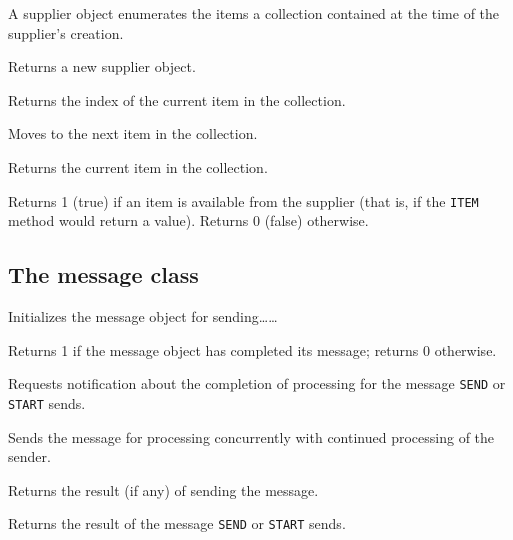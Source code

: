 A supplier object enumerates the items a collection contained at the
time of the supplier's creation.



Returns a new supplier object.



Returns the index of the current item in the collection.



Moves to the next item in the collection.



Returns the current item in the collection.



Returns 1 (true) if an item is available from the supplier (that is, if
the \texttt{ITEM} method would return a value). Returns 0 (false)
otherwise.

\subsection{The message class}\label{the-message-class}



Initializes the message object for sending\ldots\ldots{}



Returns 1 if the message object has completed its message; returns 0
otherwise.



Requests notification about the completion of processing for the message
\texttt{SEND} or \texttt{START} sends.



Sends the message for processing concurrently with continued processing
of the sender.



Returns the result (if any) of sending the message.



Returns the result of the message \texttt{SEND} or \texttt{START} sends.
